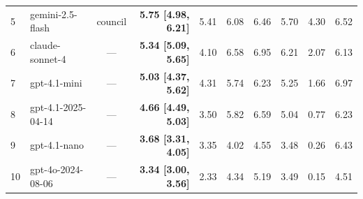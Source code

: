 \documentclass{article}
\begin{document}
\begin{table}[htb]
\begin{center}
{\begin{tabular}{@{}llcrrrrrrr@{}}
5 & gemini-2.5-flash & council &\cellcolor[HTML]{2BA0C2}\textcolor[HTML]{FFFFFF}{\textbf{5.75 {[}4.98, 6.21{]}}}&\cellcolor[HTML]{35AAC3}\textcolor[HTML]{FFFFFF}{5.41}&\cellcolor[HTML]{2296C1}\textcolor[HTML]{FFFFFF}{6.08}&\cellcolor[HTML]{1E88BC}\textcolor[HTML]{FFFFFF}{6.46}&\cellcolor[HTML]{2DA1C2}\textcolor[HTML]{FFFFFF}{5.70}&\cellcolor[HTML]{64C3BF}\textcolor[HTML]{000000}{4.30}&\cellcolor[HTML]{1E86BB}\textcolor[HTML]{FFFFFF}{6.52} \\
6 & claude-sonnet-4 & --- &\cellcolor[HTML]{37ACC3}\textcolor[HTML]{FFFFFF}{\textbf{5.34 {[}5.09, 5.65{]}}}&\cellcolor[HTML]{6EC7BE}\textcolor[HTML]{000000}{4.10}&\cellcolor[HTML]{1E84BA}\textcolor[HTML]{FFFFFF}{6.58}&\cellcolor[HTML]{2074B3}\textcolor[HTML]{FFFFFF}{6.95}&\cellcolor[HTML]{1E92C0}\textcolor[HTML]{FFFFFF}{6.21}&\cellcolor[HTML]{D4EEB3}\textcolor[HTML]{000000}{2.07}&\cellcolor[HTML]{2095C0}\textcolor[HTML]{FFFFFF}{6.13} \\
7 & gpt-4.1-mini & --- &\cellcolor[HTML]{40B5C4}\textcolor[HTML]{000000}{\textbf{5.03 {[}4.37, 5.62{]}}}&\cellcolor[HTML]{63C3BF}\textcolor[HTML]{000000}{4.31}&\cellcolor[HTML]{2CA0C2}\textcolor[HTML]{FFFFFF}{5.74}&\cellcolor[HTML]{1E92C0}\textcolor[HTML]{FFFFFF}{6.23}&\cellcolor[HTML]{3AAFC3}\textcolor[HTML]{000000}{5.25}&\cellcolor[HTML]{E1F3B2}\textcolor[HTML]{000000}{1.66}&\cellcolor[HTML]{2074B2}\textcolor[HTML]{FFFFFF}{6.97} \\
8 & gpt-4.1-2025-04-14 & --- &\cellcolor[HTML]{52BCC2}\textcolor[HTML]{000000}{\textbf{4.66 {[}4.49, 5.03{]}}}&\cellcolor[HTML]{8DD3BA}\textcolor[HTML]{000000}{3.50}&\cellcolor[HTML]{299EC1}\textcolor[HTML]{FFFFFF}{5.82}&\cellcolor[HTML]{1E83B9}\textcolor[HTML]{FFFFFF}{6.59}&\cellcolor[HTML]{40B5C4}\textcolor[HTML]{000000}{5.04}&\cellcolor[HTML]{F4FBC0}\textcolor[HTML]{000000}{0.77}&\cellcolor[HTML]{1E92C0}\textcolor[HTML]{FFFFFF}{6.23} \\
9 & gpt-4.1-nano & --- &\cellcolor[HTML]{83CFBB}\textcolor[HTML]{000000}{\textbf{3.68 {[}3.31, 4.05{]}}}&\cellcolor[HTML]{96D6B9}\textcolor[HTML]{000000}{3.35}&\cellcolor[HTML]{72C8BD}\textcolor[HTML]{000000}{4.02}&\cellcolor[HTML]{57BEC1}\textcolor[HTML]{000000}{4.55}&\cellcolor[HTML]{8FD3B9}\textcolor[HTML]{000000}{3.48}&\cellcolor[HTML]{FBFED1}\textcolor[HTML]{000000}{0.26}&\cellcolor[HTML]{1E8ABD}\textcolor[HTML]{FFFFFF}{6.43} \\
10 & gpt-4o-2024-08-06 & --- &\cellcolor[HTML]{97D6B9}\textcolor[HTML]{000000}{\textbf{3.34 {[}3.00, 3.56{]}}}&\cellcolor[HTML]{CCEBB4}\textcolor[HTML]{000000}{2.33}&\cellcolor[HTML]{62C2BF}\textcolor[HTML]{000000}{4.34}&\cellcolor[HTML]{3CB0C3}\textcolor[HTML]{000000}{5.19}&\cellcolor[HTML]{8ED3BA}\textcolor[HTML]{000000}{3.49}&\cellcolor[HTML]{FDFED4}\textcolor[HTML]{000000}{0.15}&\cellcolor[HTML]{59BFC0}\textcolor[HTML]{000000}{4.51} \\

\end{tabular}}
\end{center}
\end{table}
\end{document}
